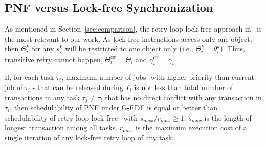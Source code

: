 \subsection{PNF versus Lock-free Synchronization\label{pnf vs lock free sec}}
%
As mentioned in Section~\ref{sec:comparison}, the retry-loop lock-free approach in~\cite{key-5} is the most relevant to our work. As lock-free instructions access only one object, then $\Theta_i^k$ for any $s_i^k$ will be restricted to one object only (i.e., $\Theta_i^k=\theta_i^k$). Thus, transitive retry cannot happen, $\Theta_i^{ex}=\Theta_i$ and $\gamma_i^{ex}=\gamma_i$.
%
\begin{clm}\label{PNF lock-free comparison}
%
If, for each task $\tau_i$, maximum number of jobs- with higher priority than current job of
$\tau_{i}$ - that can be released during $T_{i}$ is not less than total number of transactions in any task $\tau_{j}\neq\tau_{i}$ that has no direct conflict with any transaction in $\tau_{i}$, then schedulability of PNF under G-EDF is equal or better than schedulability of retry-loop lock-free~\cite{key-5} with $s_{max}/r_{max} \ge 1$. $s_{max}$ is the length of longest transaction among all tasks. $r_{max}$ is the maximum execution cost of a single iteration of any lock-free retry loop of any task.
%
\end{clm}
%
